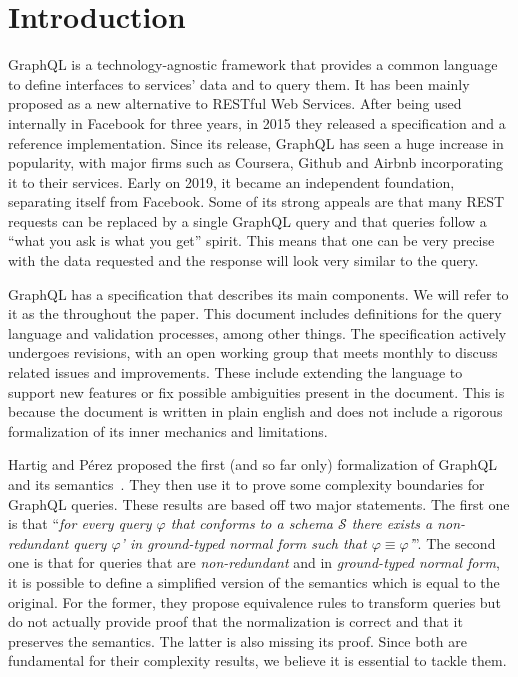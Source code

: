 
\section{Introduction}

GraphQL is a technology-agnostic framework that provides a common language to define interfaces to services' data and to query them. It has been mainly proposed as a new alternative to RESTful Web Services. After being used internally in Facebook for three years, in 2015 they released a specification and a reference implementation. Since its release, GraphQL has seen a huge increase in popularity, with major firms such as Coursera, Github and Airbnb incorporating it to their services. Early on 2019, it became an independent foundation, separating itself from Facebook. Some of its strong appeals are that many REST requests can be replaced by a single GraphQL query and that queries follow a ``what you ask is what you get'' spirit. This means that one can be very precise with the data requested and the response will look very similar to the query.

GraphQL has a specification that describes its main components. We will refer to it as the \spec throughout the paper. This document includes definitions for the query language and validation processes, among other things. The specification actively undergoes revisions, with an open working group that meets monthly to discuss related issues and improvements. These include extending the language to support new features or fix possible ambiguities present in the document. This is because the document is written in plain english and does not include a rigorous formalization of its inner mechanics and limitations.

Hartig and Pérez proposed the first (and so far only) formalization of GraphQL and its semantics~\cite{gqlph}. They then use it to prove some complexity boundaries for GraphQL queries. These results are based off two major statements. The first one is that ``\textit{for every query $\varphi$ that conforms to a schema $\mathcal{S}$ there exists a {\normalfont non-redundant} query $\varphi$' in {\normalfont ground-typed normal form} such that $\varphi \equiv \varphi$'}''. The second one is that for queries that are \textit{non-redundant} and in \textit{ground-typed normal form}, it is possible to define a simplified version of the semantics which is equal to the original.
For the former, they propose equivalence rules to transform queries but do not actually provide proof that the normalization is correct and that it preserves the semantics. The latter is also missing its proof. Since both are fundamental for their complexity results, we believe it is essential to tackle them.

